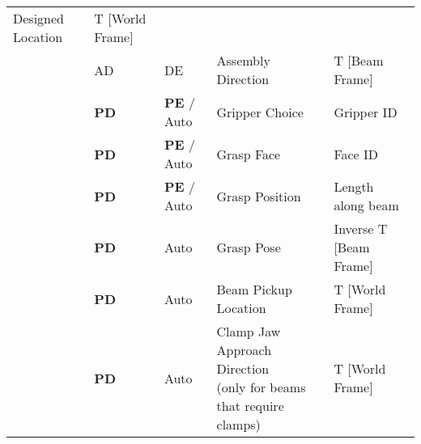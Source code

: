 \begin{table}[H]
\begin{adjustbox}{max width=\textwidth}
\begin{tabular}{p{2.09cm}p{1.51cm}p{1.93cm}p{5.92cm}p{4.48cm}}
\multicolumn{1}{|p{5.92cm}}{{\footnotesize Designed Location}} & 
\multicolumn{1}{|p{4.48cm}|}{{\footnotesize T [World Frame]}} \\ 
\hhline{~----}
\multicolumn{1}{|p{2.09cm}}{} & 
\multicolumn{1}{|p{1.51cm}}{{\footnotesize AD}} & 
\multicolumn{1}{|p{1.93cm}}{{\footnotesize DE}} & 
\multicolumn{1}{|p{5.92cm}}{{\footnotesize Assembly Direction}} & 
\multicolumn{1}{|p{4.48cm}|}{{\footnotesize T [Beam Frame]}} \\ 
\hhline{~----}
\multicolumn{1}{|p{2.09cm}}{} & 
\multicolumn{1}{|p{1.51cm}}{{\footnotesize \textbf{PD}}} & 
\multicolumn{1}{|p{1.93cm}}{{\footnotesize \textbf{PE }/ Auto}} & 
\multicolumn{1}{|p{5.92cm}}{{\footnotesize Gripper Choice}} & 
\multicolumn{1}{|p{4.48cm}|}{{\footnotesize Gripper ID}} \\ 
\hhline{~----}
\multicolumn{1}{|p{2.09cm}}{} & 
\multicolumn{1}{|p{1.51cm}}{{\footnotesize \textbf{PD}}} & 
\multicolumn{1}{|p{1.93cm}}{{\footnotesize \textbf{PE }/ Auto}} & 
\multicolumn{1}{|p{5.92cm}}{{\footnotesize Grasp Face}} & 
\multicolumn{1}{|p{4.48cm}|}{{\footnotesize Face ID}} \\ 
\hhline{~----}
\multicolumn{1}{|p{2.09cm}}{} & 
\multicolumn{1}{|p{1.51cm}}{{\footnotesize \textbf{PD}}} & 
\multicolumn{1}{|p{1.93cm}}{{\footnotesize \textbf{PE }/ Auto}} & 
\multicolumn{1}{|p{5.92cm}}{{\footnotesize Grasp Position}} & 
\multicolumn{1}{|p{4.48cm}|}{{\footnotesize Length along beam}} \\ 
\hhline{~----}
\multicolumn{1}{|p{2.09cm}}{} & 
\multicolumn{1}{|p{1.51cm}}{{\footnotesize \textbf{PD}}} & 
\multicolumn{1}{|p{1.93cm}}{{\footnotesize Auto}} & 
\multicolumn{1}{|p{5.92cm}}{{\footnotesize Grasp Pose}} & 
\multicolumn{1}{|p{4.48cm}|}{{\footnotesize Inverse T [Beam Frame]}} \\ 
\hhline{~----}
\multicolumn{1}{|p{2.09cm}}{} & 
\multicolumn{1}{|p{1.51cm}}{{\footnotesize \textbf{PD}}} & 
\multicolumn{1}{|p{1.93cm}}{{\footnotesize Auto}} & 
\multicolumn{1}{|p{5.92cm}}{{\footnotesize Beam Pickup Location}} & 
\multicolumn{1}{|p{4.48cm}|}{{\footnotesize T [World Frame]}} \\ 
\hhline{~----}
\multicolumn{1}{|p{2.09cm}}{} & 
\multicolumn{1}{|p{1.51cm}}{{\footnotesize \textbf{PD}}} & 
\multicolumn{1}{|p{1.93cm}}{{\footnotesize Auto}} & 
\multicolumn{1}{|p{5.92cm}}{{\footnotesize Clamp Jaw Approach Direction} \newline
{\scriptsize (only for beams that require clamps)}} & 
\multicolumn{1}{|p{4.48cm}|}{{\footnotesize T [World Frame]}} \\ 

\end{tabular}
\end{adjustbox}
\end{table}
